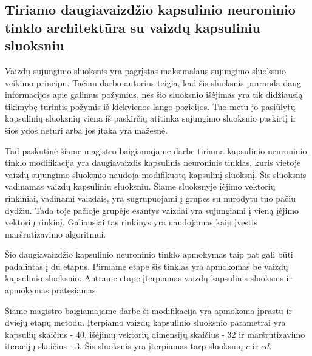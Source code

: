 \subsection{Tiriamo daugiavaizdžio kapsulinio neuroninio tinklo architektūra su vaizdų kapsuliniu sluoksniu}

Vaizdų sujungimo sluoksnis yra pagrįstas maksimalaus sujungimo sluoksnio veikimo principu. Tačiau darbo \cite{capsNet} autorius teigia, kad šis sluoksnis praranda daug informacijos apie galimus požymius, nes šio sluoksnio išėjimas yra tik didžiausią tikimybę turintis požymis iš kiekvienos lango pozicijos. Tuo metu jo pasiūlytų kapsulinių sluoksnių viena iš paskirčių atitinka sujungimo sluoksnio paskirtį ir šios ydos neturi arba jos įtaka yra mažesnė.

Tad paskutinė šiame magistro baigiamajame darbe tiriama kapsulinio neuroninio tinklo modifikacija yra daugiavaizdis kapsulinis neuroninis tinklas, kuris vietoje vaizdų sujungimo sluoksnio naudoja modifikuotą kapsulinį sluoksnį. Šis sluoksnis vadinamas vaizdų kapsuliniu sluoksniu. Šiame sluoksnyje įėjimo vektorių rinkiniai, vadinami vaizdais, yra sugrupuojami į grupes su nurodytu tuo pačiu dydžiu. Tada toje pačioje grupėje esantys vaizdai yra sujungiami į vieną įėjimo vektorių rinkinį. Galiausiai tas rinkinys yra naudojamas kaip įvestis maršrutizavimo algoritmui.

Šio daugiavaizdžio kapsulinio neuroninio tinklo apmokymas taip pat gali būti padalintas į du etapus. Pirmame etape šis tinklas yra apmokomas be vaizdų kapsulinio sluoksnio. Antrame etape įterpiamas vaizdų kapsulinis sluoksnis ir apmokymas pratęsiamas.

Šiame magistro baigiamajame darbe ši modifikacija yra apmokoma įprastu ir dviejų etapų metodu. Įterpiamo vaizdų kapsulinio sluoksnio parametrai yra kapsulių skaičius - 40, išėjimų vektorių dimensijų skaičius - 32 ir maršrutizavimo iteracijų skaičius - 3. Šis sluoksnis yra įterpiamas tarp sluoksnių $c$ ir $ed$.

